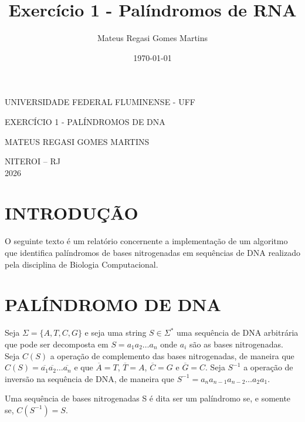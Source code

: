 \documentclass{report}
\title{Exercício 1 - Palíndromos de RNA}
\author{Mateus Regasi Gomes Martins}
\date{\today}
\begin{document}
\begin{titlepage}  
  
\begin{center}  
UNIVERSIDADE FEDERAL FLUMINENSE - UFF
\end{center}  
  
\vspace{8cm}  
  
\begin{center}  
{  
EXERCÍCIO 1 - PALÍNDROMOS DE DNA
}  
\end{center}  
  
\vspace{1cm}  
  
\begin{flushright}  
MATEUS REGASI GOMES MARTINS
\end{flushright}  
  
\vfill  
  
\begin{center}  
NITEROI -- RJ\\  
2026  
\end{center}  
  
\end{titlepage}

\section{INTRODUÇÃO}
O seguinte texto é um relatório concernente a implementação de um algoritmo que identifica palíndromos de bases nitrogenadas em sequências de DNA realizado pela disciplina de Biologia Computacional.

\section{PALÍNDROMO DE DNA}
Seja $\Sigma = \{A,T,C,G\}$ e seja uma string $S \in \Sigma^*$ uma sequência de DNA arbitrária que pode ser decomposta em $S=a_1a_2\dots a_n$ onde $a_i$ são as bases nitrogenadas. Seja $C(S)$ a operação de complemento das bases nitrogenadas, de maneira que $C(S) = \overline{a_1}\overline{a_2}\dots\overline{a_n}$ e que $\overline A = T$, $\overline{T} = A$, $\overline{C} = G$ e $\overline{G} = C$. Seja $S^{-1}$ a operação de inversão na sequência de DNA, de maneira que $S^{-1} = a_na_{n-1}a_{n-2}\dots a_2 a_1$.

Uma sequência de bases nitrogenadas S é dita ser um palíndromo se, e somente se, $C(S^{-1}) = S$. 
\end{document}
